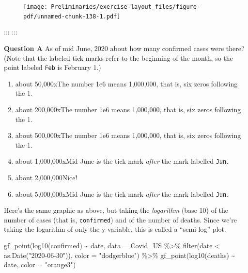 \documentclass[
  letterpaper,
  DIV=11,
  numbers=noendperiod,
  oneside]{article}
\newenvironment{Shaded}{\begin{snugshade}}{\end{snugshade}}
\newcommand{\AttributeTok}[1]{\textcolor[rgb]{0.40,0.45,0.13}{#1}}
\newcommand{\FunctionTok}[1]{\textcolor[rgb]{0.28,0.35,0.67}{#1}}
\newcommand{\NormalTok}[1]{\textcolor[rgb]{0.00,0.23,0.31}{#1}}
\newcommand{\SpecialCharTok}[1]{\textcolor[rgb]{0.37,0.37,0.37}{#1}}
\newcommand{\StringTok}[1]{\textcolor[rgb]{0.13,0.47,0.30}{#1}}
\providecommand{\tightlist}{%
  \setlength{\itemsep}{0pt}\setlength{\parskip}{0pt}}\usepackage{longtable,booktabs,array}
\begin{document}
\begin{multicols}{2}
\begin{figure}[H]

{\centering \texttt{[image: Preliminaries/exercise-layout\_files/figure-pdf/unnamed-chunk-138-1.pdf]}

}

\end{figure}

::: :::

\textbf{Question A} As of mid June, 2020 about how many confirmed cases
were there? (Note that the labeled tick marks refer to the beginning of
the month, so the point labeled \texttt{Feb} is February 1.)

\begin{enumerate}
\def\labelenumi{\roman{enumi}.}
\tightlist
\item
  {about 50,000{xThe number 1e6 means 1,000,000, that is, six zeros
  following the 1.}}\\
\item
  {about 200,000{xThe number 1e6 means 1,000,000, that is, six zeros
  following the 1.}}\\
\item
  {about 500,000{xThe number 1e6 means 1,000,000, that is, six zeros
  following the 1.}}\\
\item
  {about 1,000,000{xMid June is the tick mark \emph{after} the mark
  labelled \texttt{Jun}.}}\\
\item
  {about 2,000,000{Nice!~}}\\
\item
  {about 5,000,000{xMid June is the tick mark \emph{after} the mark
  labelled \texttt{Jun}.}}
\end{enumerate}

Here's the same graphic as above, but taking the \emph{logarithm} (base
10) of the number of cases (that is, \texttt{confirmed}) and of the
number of deaths. Since we're taking the logarithm of only the
y-variable, this is called a ``semi-log'' plot.

\begin{Shaded}
\begin{Highlighting}[]
\FunctionTok{gf\_point}\NormalTok{(}\FunctionTok{log10}\NormalTok{(confirmed) }\SpecialCharTok{\textasciitilde{}}\NormalTok{ date, }
         \AttributeTok{data =}\NormalTok{ Covid\_US }\SpecialCharTok{\%\textgreater{}\%} \FunctionTok{filter}\NormalTok{(date }\SpecialCharTok{\textless{}} \FunctionTok{as.Date}\NormalTok{(}\StringTok{"2020{-}06{-}30"}\NormalTok{)), }
         \AttributeTok{color =} \StringTok{"dodgerblue"}\NormalTok{) }\SpecialCharTok{\%\textgreater{}\%}
  \FunctionTok{gf\_point}\NormalTok{(}\FunctionTok{log10}\NormalTok{(deaths) }\SpecialCharTok{\textasciitilde{}}\NormalTok{ date, }\AttributeTok{color =} \StringTok{"orange3"}\NormalTok{) }
\end{Highlighting}
\end{Shaded}


\end{multicols}
\end{document}
